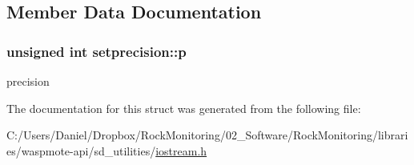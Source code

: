 \subsection{Member Data Documentation}
\subsubsection[{\texorpdfstring{p}{p}}]{\setlength{\rightskip}{0pt plus 5cm}unsigned int setprecision\+::p}\hypertarget{structsetprecision_a7cb7bb355a303fa39a8035615bde9348}{}\label{structsetprecision_a7cb7bb355a303fa39a8035615bde9348}
precision 

The documentation for this struct was generated from the following file\+:\begin{DoxyCompactItemize}
\item 
C\+:/\+Users/\+Daniel/\+Dropbox/\+Rock\+Monitoring/02\+\_\+\+Software/\+Rock\+Monitoring/libraries/waspmote-\/api/sd\+\_\+utilities/\hyperlink{iostream_8h}{iostream.\+h}\end{DoxyCompactItemize}
